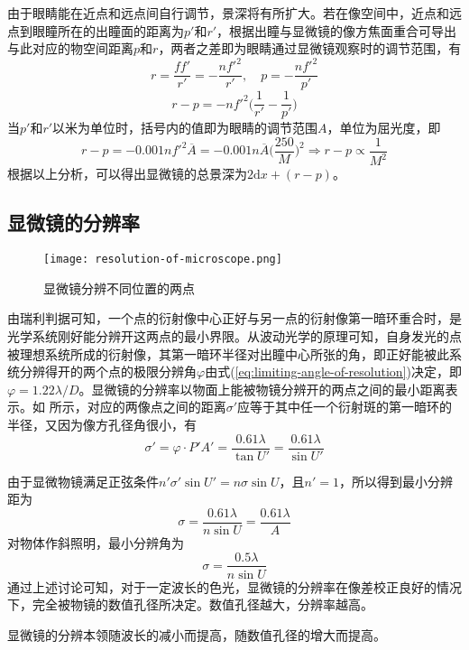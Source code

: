 由于眼睛能在近点和远点间自行调节，景深将有所扩大。若在像空间中，近点和远点到眼瞳所在的出瞳面的距离为$p'$和$r'$，根据出瞳与显微镜的像方焦面重合可导出与此对应的物空间距离$p$和$r$，两者之差即为眼睛通过显微镜观察时的调节范围，有
\begin{equation}
r=\frac{ff'}{r'}=-\frac{nf'^2}{r'},\quad p=-\frac{nf'^2}{p'}
\end{equation}
\begin{equation}
r-p=-nf'^2\bigg(\frac{1}{r'}-\frac{1}{p'}\bigg)
\end{equation}
当$p'$和$r'$以米为单位时，括号内的值即为眼睛的调节范围$A$，单位为屈光度，即
\begin{equation}
r-p=-0.001nf'^2\overline{A}=-0.001n\overline{A}\bigg(\frac{250}{M}\bigg)^2\Rightarrow r-p\propto\frac{1}{M^2}
\end{equation}
根据以上分析，可以得出显微镜的总景深为$2\mathrm{d}x+(r-p)$。

\subsection{显微镜的分辨率}

\begin{figure}[htbp]
	\centering
	\texttt{[image: resolution-of-microscope.png]}
	\caption{显微镜分辨不同位置的两点}
	\label{fig:resolution-of-microscope}
\end{figure}

由瑞利判据可知，一个点的衍射像中心正好与另一点的衍射像第一暗环重合时，是光学系统刚好能分辨开这两点的最小界限。从波动光学的原理可知，自身发光的点被理想系统所成的衍射像，其第一暗环半径对出瞳中心所张的角，即正好能被此系统分辨得开的两个点的极限分辨角$\varphi$由式(\ref{eq:limiting-angle-of-resolution})决定，即$\varphi=1.22\lambda/D$。显微镜的分辨率以物面上能被物镜分辨开的两点之间的最小距离表示。如 所示，对应的两像点之间的距离$\sigma'$应等于其中任一个衍射斑的第一暗环的半径，又因为像方孔径角很小，有
\begin{equation}
\sigma'=\varphi\cdot P'A'=\frac{0.61\lambda}{\tan U'}=\frac{0.61\lambda}{\sin U'}
\end{equation}

由于显微物镜满足正弦条件$n'\sigma'\sin U'=n\sigma\sin U$，且$n'=1$，所以得到最小分辨距为
\begin{equation}
\sigma=\frac{0.61\lambda}{n\sin U}=\frac{0.61\lambda}{A}
\end{equation}
对物体作斜照明，最小分辨角为
\begin{equation}
\sigma=\frac{0.5\lambda}{n\sin U}
\end{equation}
通过上述讨论可知，对于一定波长的色光，显微镜的分辨率在像差校正良好的情况下，完全被物镜的数值孔径所决定。数值孔径越大，分辨率越高。
\begin{property}
	显微镜的分辨本领随波长的减小而提高，随数值孔径的增大而提高。
\end{property}

